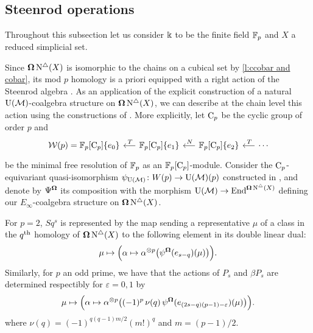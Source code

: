 
\subsection{Steenrod operations}

Throughout this subsection let us consider $\Bbbk$ to be the finite field ${\mathbb{F}_p}$ and $X$ a reduced simplicial set.

Since $\operatorname{\mathbf{\Omega}} \operatorname{N^{\triangle}}(X)$ is isomorphic to the chains on a cubical set by \cref{l:ccobar and cobar}, its mod $p$ homology is a priori equipped with a right action of the Steenrod algebra \cite{bibid}.
As an application of the explicit construction of a natural ${\operatorname{U}(\mathcal{M})}$-coalgebra structure on $\operatorname{\mathbf{\Omega}} \operatorname{N^{\triangle}}(X)$, we can describe at the chain level this action using the constructions of \cite{medina2020maysteenrod}.
More explicitly, let ${\mathrm{C}_p}$ be the cyclic group of order $p$ and
\begin{equation*}
\begin{tikzcd} [column sep = .5cm]
\mathcal W(p) = \Fp[\Cp]\{e_0\} & \arrow[l, "\,T"'] \Fp[\Cp]\{e_1\} & \arrow[l, "\,N"'] \Fp[\Cp]\{e_2\} & \arrow[l, "\,T"'] \cdots
\end{tikzcd}
\end{equation*}
be the minimal free resolution of ${\mathbb{F}_p}$ as an ${\mathbb{F}_p}[{\mathrm{C}_p}]$-module.
Consider the ${\mathrm{C}_p}$-equivariant quasi-isomorphism $\psi_{\operatorname{U}(\mathcal{M})} \colon W(p) \to {\operatorname{U}(\mathcal{M})}(p)$ constructed in \cite{medina2020maysteenrod}, and denote by $\Psi^{\operatorname{\mathbf{\Omega}}}$ its composition with the morphism ${\operatorname{U}(\mathcal{M})} \to \mathrm{End}^{\operatorname{\mathbf{\Omega}} \operatorname{N^{\triangle}}(X)}$ defining our $E_\infty$-coalgebra structure on $\operatorname{\mathbf{\Omega}} \operatorname{N^{\triangle}}(X)$.

For $p = 2$, $Sq^s$ is represented by the map sending a representative $\mu$ of a class in the $q^\mathrm{th}$ homology of $\operatorname{\mathbf{\Omega}} \operatorname{N^{\triangle}}(X)$ to the following element in its double linear dual:
\begin{equation*}
\mu \mapsto \Big( \alpha \mapsto \alpha^{\otimes p} \big( \psi^{\operatorname{\mathbf{\Omega}}}(e_{s-q})(\mu) \big) \Big).
\end{equation*}
Similarly, for $p$ an odd prime, we have that the actions of $P_s$ and $\beta P_s$ are determined respectibly for $\varepsilon = 0,1$ by
\begin{equation*}
\mu \mapsto \Big( \alpha \mapsto \alpha^{\otimes p} \big( (-1)^p \, \nu(q) \, \psi^{\operatorname{\mathbf{\Omega}}}(e_{(2s-q)(p-1)-\varepsilon})(\mu) \big) \Big).
\end{equation*}
where $\nu(q) = (-1)^{q(q-1)m/2}(m!)^q$ and $m = (p-1)/2$.

